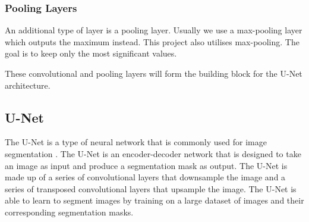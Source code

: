 \documentclass[12pt]{article}
\begin{document}

\subsubsection*{Pooling Layers}




An additional type of layer is a pooling layer. Usually we use a max-pooling layer which outputs the maximum instead. This project also utilises max-pooling. The goal is to keep only the most significant values.

These convolutional and pooling layers will form the building block for the U-Net architecture.









\subsection{U-Net}

The U-Net is a type of neural network that is commonly used for image segmentation \cite{ronneberger2015unet}.
The U-Net is an encoder-decoder network that is designed to take an image as input and produce a segmentation mask as output.
The U-Net is made up of a series of convolutional layers that downsample the image and a series of transposed convolutional layers that upsample the image.
The U-Net is able to learn to segment images by training on a large dataset of images and their corresponding segmentation masks.
\end{document}
